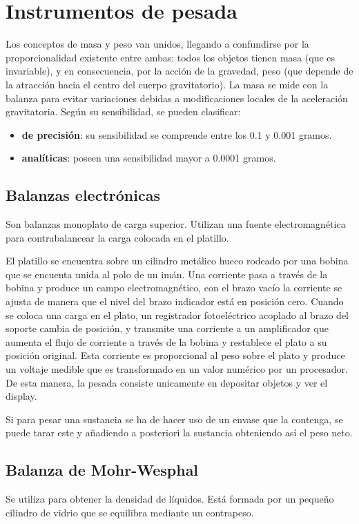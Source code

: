 \section{Instrumentos de pesada}
Los conceptos de masa y peso van unidos, llegando a confundirse por la proporcionalidad existente entre ambas: todos los objetos tienen masa (que es invariable), y en consecuencia, por la acción de la gravedad, peso (que depende de la atracción hacia el centro del cuerpo gravitatorio).  La masa se mide con la balanza para evitar variaciones debidas a modificaciones locales de la aceleración gravitatoria. Según su sensibilidad, se pueden clasificar:
\begin{itemize}[itemsep=0pt,parsep=0pt,topsep=0pt,partopsep=0pt]
    \item \textbf{de precisión}: su sensibilidad se comprende entre los 0.1 y 0.001 gramos.
    \item\textbf{analíticas}: poseen una sensibilidad mayor a 0.0001 gramos.
\end{itemize}
\subsection{Balanzas electrónicas}
Son balanzas monoplato de carga superior. Utilizan una fuente electromagnética para contrabalancear la carga colocada en el platillo.

El platillo se encuentra sobre un cilindro metálico hueco rodeado por una bobina que se encuenta unida al polo de un imán. Una corriente pasa a través de la bobina y produce un campo electromagnético, con el brazo vacío la corriente se ajusta de manera que el nivel del brazo indicador está en posición cero. Cuando se coloca una carga en el plato, un registrador fotoeléctrico acoplado al brazo del soporte cambia de posición, y transmite una corriente a un amplificador que aumenta el flujo de corriente a través de la bobina y restablece el plato a su posición original. Esta corriente es proporcional al peso sobre el plato y produce un voltaje medible que es transformado en un valor numérico por un procesador. De esta manera, la pesada consiste unicamente en depositar objetos y ver el display.

Si para pesar una sustancia se ha de hacer uso de un envase que la contenga, se puede tarar este y añadiendo a posteriori la sustancia obteniendo así el peso neto.
\subsection{Balanza de Mohr-Wesphal}
Se utiliza para obtener la densidad de líquidos. Está formada por un pequeño cilindro de vidrio que se equilibra mediante un contrapeso.

